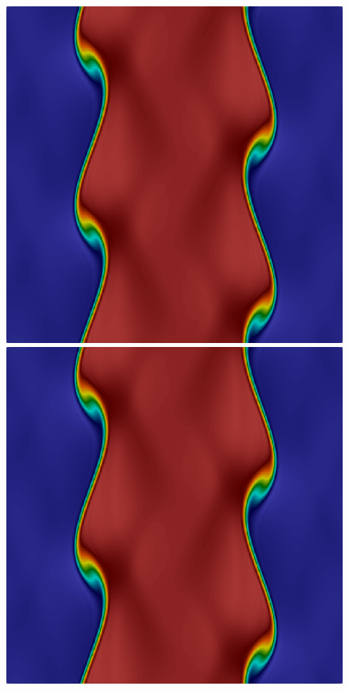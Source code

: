 \begin{figure}[h!]
\includegraphics[scale=0.115]{data/Compressible_Euler/KH/Snapshots/density_200_461.png}\hspace{1em}
\includegraphics[scale=0.115]{data/Compressible_Euler/KH/Snapshots/density_500_461.png}\hspace{1em}

\end{figure}
